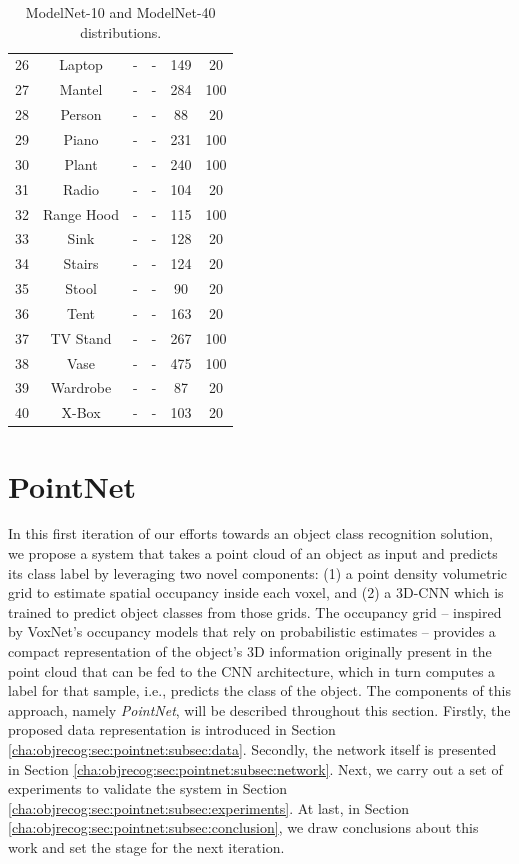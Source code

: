 \begin{table}
\begin{tabular}{rccccc}
    26 & Laptop	  & -	 & -	 & 149	& 20 \\
    27 & Mantel	  & -	 & -	 & 284	& 100 \\
    28 & Person	  & -	 & -	 & 88	& 20 \\
    29 & Piano	  & -	 & -	 & 231	& 100 \\
    30 & Plant	  & -	 & -	 & 240	& 100 \\
    31 & Radio	  & -	 & -	 & 104  & 20 \\
    32 & Range Hood & -	 & -	 & 115	& 100 \\
    33 & Sink	  & -	 & -	 & 128	& 20 \\
    34 & Stairs 	 & -	 & -	 & 124	& 20 \\
    35 & Stool 	 & -	 & -	 & 90	& 20 \\
    36 & Tent  	 & -	 & -	 & 163	& 20 \\
    37 & TV Stand  & -	 & -	 & 267	& 100 \\
    38 & Vase	 & -	 & -	 & 475	& 100 \\
    39 & Wardrobe  & -	 & -	 & 87	& 20 \\
    40 & X-Box	 & -	 & -	& 103	& 20 \\
    \bottomrule
    \end{tabular}
    \caption{ModelNet-10 and ModelNet-40 distributions.}
    \label{table:objrecog:modelnet_distribution}
\end{table}

\section{PointNet}
\label{cha:objrecog:sec:pointnet}

In this first iteration of our efforts towards an object class recognition solution, we propose a system that takes a point cloud of an object as input and predicts its class label by leveraging two novel components: (1) a point density volumetric grid to estimate spatial occupancy inside each voxel, and (2) a \ac{3D}-\ac{CNN} which is trained to predict object classes from those grids. The occupancy grid -- inspired by VoxNet's \cite{Maturana2015} occupancy models that rely on probabilistic estimates -- provides a compact representation of the object's \ac{3D} information originally present in the point cloud that can be fed to the \ac{CNN} architecture, which in turn computes a label for that sample, i.e., predicts the class of the object. The components of this approach, namely \emph{PointNet}, will be described throughout this section. Firstly, the proposed data representation is introduced in Section \ref{cha:objrecog:sec:pointnet:subsec:data}. Secondly, the network itself is presented in Section \ref{cha:objrecog:sec:pointnet:subsec:network}. Next, we carry out a set of experiments to validate the system in Section \ref{cha:objrecog:sec:pointnet:subsec:experiments}. At last, in Section \ref{cha:objrecog:sec:pointnet:subsec:conclusion}, we draw conclusions about this work and set the stage for the next iteration.

